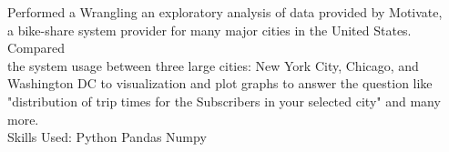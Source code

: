 \documentclass[]{aj-resume-openfont}
\begin{document}
\begin{minipage}[t]{0.66\textwidth}
Performed a Wrangling an exploratory analysis of data provided by Motivate,\\
a bike-share system provider for many major cities in the United States. Compared\\
the system usage between three large cities: New York City, Chicago, and \\
Washington DC to visualization and plot graphs to answer the question like \\
"distribution of trip times for the Subscribers in your selected city" and many more.\\
Skills Used: \textbullet{} Python \textbullet{} Pandas \textbullet{} Numpy 
\sectionsep






\end{minipage} 
\end{document}
